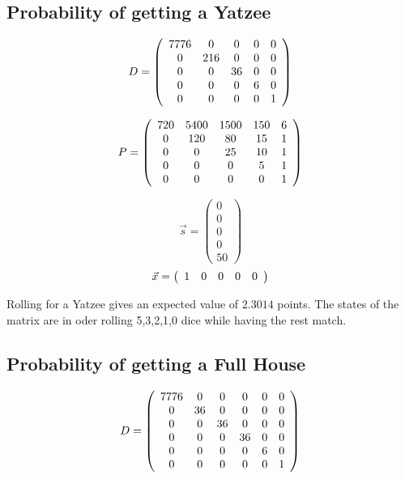 \subsection{Probability of getting a Yatzee}

\[
D=
\left(
\begin{array}{c c c c c c}
7776& 0 	&0	&0	&0\\
0 	& 216	&0	&0	&0\\
0 	&0		&36	&0	&0\\
0 	&0		&0	&6	&0\\
0 	&0		&0	&0	&1
\end{array}
\right)
\]

\[
P=
\left(
\begin{array}{c c c c c}
720 & 5400 & 1500 & 150 & 6 \\
0 & 120 & 80 & 15 & 1 \\
0 & 0 & 25 & 10 & 1 \\
0 & 0 & 0 & 5 & 1 \\
0 & 0 & 0 & 0 & 1
\end{array}
\right)
\]

\[
\vec{s}=
\left(
\begin{array}{c}
0\\
0\\
0\\
0\\
50
\end{array}
\right)
\]
\[
\vec{x}=
\left(
\begin{array}{c c c c c}
1&0&0&0&0
\end{array}
\right)
\]

Rolling for a Yatzee gives an expected value of $2.3014$ points. The states of the matrix are in oder rolling 5,3,2,1,0 dice while having the rest match.

\subsection{Probability of getting a Full House}

\[
D=
\left(
\begin{array}{c c c c c c}

7776&0	& 0 	& 0		&0	&0\\
0	&36	& 0 	& 0		&0	&0\\
0 	&0	& 36	& 0		&0	&0\\
0 	&0	& 0		& 36	&0	&0\\
0 	&0	& 0		& 0		&6	&0\\
0 	&0	& 0		& 0		&0	&1
\end{array}
\right)
\]


